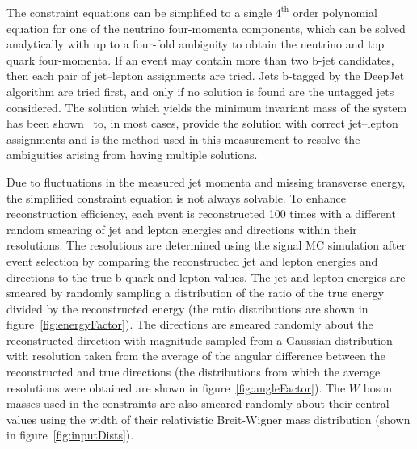 The constraint equations can be simplified to a single $4^{\text{th}}$ order polynomial equation for one of the neutrino four-momenta components, which can be solved analytically with up to a four-fold ambiguity to obtain the neutrino and top quark four-momenta.
If an event may contain more than two b-jet candidates, then each pair of jet--lepton assignments are tried.
Jets b-tagged by the DeepJet algorithm are tried first, and only if no solution is found are the untagged jets considered.
The solution which yields the minimum invariant mass of the \ttbar system has been shown~\cite{PhysRevD.73.112006} to, in most cases, provide the solution with correct jet--lepton assignments and is the method used in this measurement to resolve the ambiguities arising from having multiple solutions.

Due to fluctuations in the measured jet momenta and missing transverse energy, the simplified constraint equation is not always solvable.
To enhance reconstruction efficiency, each event is reconstructed 100 times with a different random smearing of jet and lepton energies and directions within their resolutions.
The resolutions are determined using the signal MC simulation after event selection by comparing the reconstructed jet and lepton energies and directions to the true b-quark and lepton values.
The jet and lepton energies are smeared by randomly sampling a distribution of the ratio of the true energy divided by the reconstructed energy (the ratio distributions are shown in figure~\ref{fig:energyFactor}).
The directions are smeared randomly about the reconstructed direction with magnitude sampled from a Gaussian distribution with resolution taken from the average of the angular difference between the reconstructed and true directions (the distributions from which the average resolutions were obtained are shown in figure~\ref{fig:angleFactor}).
The $W$ boson masses used in the constraints are also smeared randomly about their central values using the width of their relativistic Breit-Wigner mass distribution (shown in figure~\ref{fig:inputDists}).


